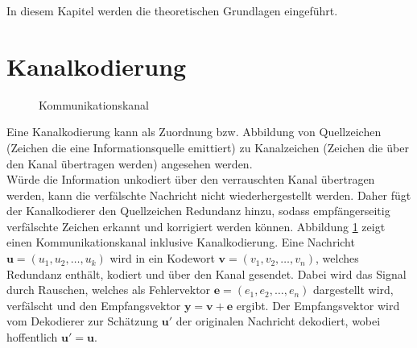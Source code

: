 In diesem Kapitel werden die theoretischen Grundlagen eingeführt.
\section{Kanalkodierung}
\label{kapitel:grundlagen_kanalkodierung}
\begin{figure}[!t]
\centering
{}
\caption{Kommunikationskanal}
\label{abb:kommunikationskanal}
\end{figure}
Eine Kanalkodierung kann als Zuordnung bzw. Abbildung von Quellzeichen (Zeichen die eine Informationsquelle emittiert) zu Kanalzeichen (Zeichen die über den Kanal übertragen werden) angesehen werden.
\\
Würde die Information unkodiert über den verrauschten Kanal übertragen werden, kann die verfälschte Nachricht nicht wiederhergestellt werden. Daher fügt der Kanalkodierer den Quellzeichen Redundanz hinzu, sodass empfängerseitig verfälschte Zeichen erkannt und korrigiert werden können. Abbildung \ref{abb:kommunikationskanal} zeigt einen Kommunikationskanal inklusive Kanalkodierung. Eine Nachricht $\mathbf{u}=(u_{1},u_{2},\dots ,u_{k})$ wird in ein Kodewort $\mathbf{v}=(v_{1},v_{2},\dots ,v_{n})$, welches Redundanz enthält, kodiert und über den Kanal gesendet. Dabei wird das Signal durch Rauschen, welches als Fehlervektor $\mathbf{e}=(e_{1},e_{2},\dots ,e_{n})$ dargestellt wird, verfälscht und den Empfangsvektor $\mathbf{y}=\mathbf{v}+\mathbf{e}$ ergibt. Der Empfangsvektor wird vom Dekodierer zur Schätzung $\mathbf{u'}$ der originalen Nachricht dekodiert, wobei hoffentlich $\mathbf{u'}=\mathbf{u}$.

